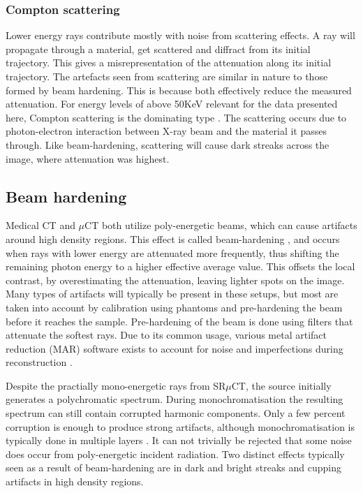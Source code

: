 \subsubsection{Compton scattering}

Lower energy rays contribute mostly with noise from scattering effects. A ray will propagate through
a material, get scattered and diffract from its initial trajectory. This gives a misrepresentation
of the attenuation along its initial trajectory. The artefacts seen from scattering are similar in
nature to those formed by beam hardening. This is because both effectively reduce the measured
attenuation. For energy levels of above 50KeV relevant for the data presented here, Compton
scattering is the dominating type \citep{compton}. The scattering occurs due to photon-electron
interaction between X-ray beam and the material it passes through. Like beam-hardening, scattering
will cause dark streaks across the image, where attenuation was highest.

\subsection{Beam hardening}\label{sec:beam-hardening}

Medical CT and $\mu$CT both utilize poly-energetic beams, which can cause artifacts around high
density regions. This effect is called beam-hardening \citep{beamhardening}, and occurs when rays
with lower energy are attenuated more frequently, thus shifting the remaining photon energy to a
higher effective average value. This offsets the local contrast, by overestimating the attenuation,
leaving lighter spots on the image. Many types of artifacts will typically be present in these
setups, but most are taken into account by calibration using phantoms and pre-hardening the beam
before it reaches the sample. Pre-hardening of the beam is done using filters that attenuate the
softest rays. Due to its common usage, various metal artifact reduction (MAR) software exists to
account for noise and imperfections during reconstruction \citep{mar1}\citep{mar2}.

Despite the practially mono-energetic rays from SR$\mu$CT, the source initially generates a
polychromatic spectrum. During monochromatisation the resulting spectrum can still contain
corrupted harmonic components. Only a few percent corruption is enough to produce strong
artifacts, although monochromatisation is typically done in multiple layers \citep{srnoise}.
It can not trivially be rejected that some noise does occur from poly-energetic incident radiation.
Two distinct effects typically seen as a result of beam-hardening are in dark and bright streaks
and cupping artifacts in high density regions.

